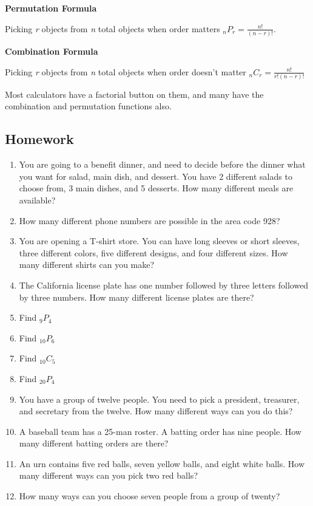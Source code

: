 \documentclass[]{book}
\begin{document}
\textbf{Permutation Formula}

Picking \emph{r} objects from \emph{n} total objects when order matters \(_{n}P_{r}=\frac{n!}{(n-r)!}\).

\textbf{Combination Formula}

Picking \emph{r} objects from \emph{n} total objects when order doesn't matter \(_{n}C_{r}=\frac{n!}{r!(n-r)!}\)

Most calculators have a factorial button on them, and many have the combination and permutation functions also.

\hypertarget{homework-13}{%
\subsection{Homework}\label{homework-13}}

\begin{enumerate}
\def\labelenumi{\arabic{enumi}.}
\item
  You are going to a benefit dinner, and need to decide before the dinner what you want for salad, main dish, and dessert. You have 2 different salads to choose from, 3 main dishes, and 5 desserts. How many different meals are available?
\item
  How many different phone numbers are possible in the area code 928?
\item
  You are opening a T-shirt store. You can have long sleeves or short sleeves, three different colors, five different designs, and four different sizes. How many different shirts can you make?
\item
  The California license plate has one number followed by three letters followed by three numbers. How many different license plates are there?
\item
  Find \(_9P_4\)
\item
  Find \(_{10}P_6\)
\item
  Find \(_{10}C_5\)
\item
  Find \(_{20}P_4\)
\item
  You have a group of twelve people. You need to pick a president, treasurer, and secretary from the twelve. How many different ways can you do this?
\item
  A baseball team has a 25-man roster. A batting order has nine people. How many different batting orders are there?
\item
  An urn contains five red balls, seven yellow balls, and eight white balls. How many different ways can you pick two red balls?
\item
  How many ways can you choose seven people from a group of twenty?
\end{enumerate}
\end{document}
